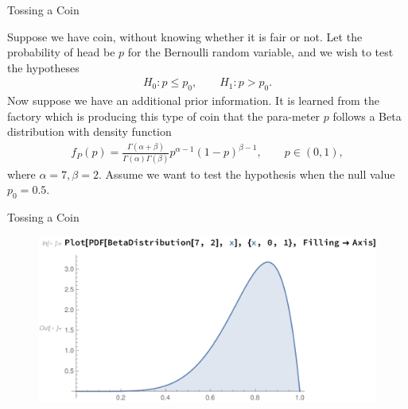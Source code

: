 \begin{frame}{Tossing a Coin}

\justifying
{} Suppose we have coin, without knowing whether it is fair or not. Let the probability of head be $p$ for the Bernoulli random variable, and we wish to test the hypotheses
\begin{align*}
H_0: p \leq p_0, \qquad H_1: p > p_0.
\end{align*}
Now suppose we have an additional prior information. It is learned from the factory which is producing this type of coin that the para-meter $p$ follows a Beta distribution with density function
\begin{align*}
f_P(p) = \frac{\Gamma(\alpha + \beta)}{\Gamma(\alpha)\Gamma(\beta)}p^{\alpha-1}(1 - p)^{\beta-1}, \qquad p\in (0, 1),
\end{align*}
where $\alpha = 7,\beta = 2$. Assume we want to test the hypothesis when the null value $p_0 = 0.5$.

\end{frame}

\begin{frame}{Tossing a Coin}

\justifying
{} 
\begin{figure}[htbp]
	\centering
	\includegraphics[width=\linewidth]{./images/rc5fig6.pdf}
\end{figure}

\end{frame}



